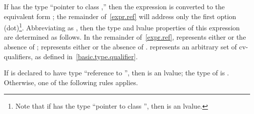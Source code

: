 \pnum
If  has the type ``pointer to class ,'' then the
expression  is converted to the equivalent form
; the remainder of~\ref{expr.ref} will address only
the first option (dot)\footnote{Note that if  has the type
``pointer to class '', then  is an lvalue.}.
Abbreviating  as ,
then the type and lvalue properties of this expression are determined
as follows. In the remainder of~\ref{expr.ref},  represents either
 or the absence of ;  represents
either  or the absence of . 
represents an arbitrary set of cv-qualifiers, as defined
in~\ref{basic.type.qualifier}.

\pnum
If  is declared to have type ``reference to '', then
 is an lvalue; the type of  is .
Otherwise, one of the following rules applies.

